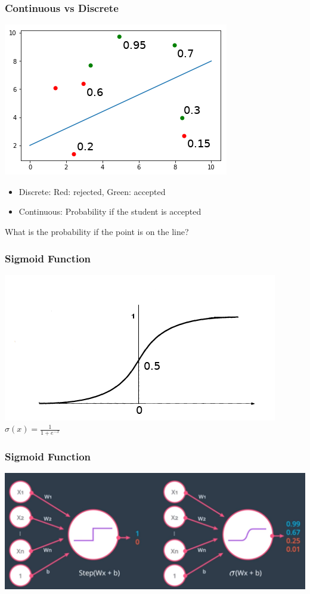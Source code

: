 \begin{frame}[fragile]
  \frametitle{Continuous vs Discrete}
  \vspace{3mm}
  \includegraphics[scale=0.4]{img/uni_data_5}\\
  \vspace{3mm}
  \begin{itemize}
  \item Discrete: Red: rejected, Green: accepted
  \item Continuous: Probability if the student is accepted
  \end{itemize}
  \begin{exercise}
  What is the probability if the point is on the line?
  \end{exercise}
\end{frame}

\begin{frame}[fragile]
  \frametitle{Sigmoid Function}
  \includegraphics[scale=0.4]{img/sigmoid}\\
  \vspace{3mm}
  $
  \sigma(x) = \frac{1}{1+e^{-x}}
  $

\end{frame}

\begin{frame}[fragile]
  \frametitle{Sigmoid Function}
  \includegraphics[scale=0.18]{img/step_sigmoid}
\end{frame}

